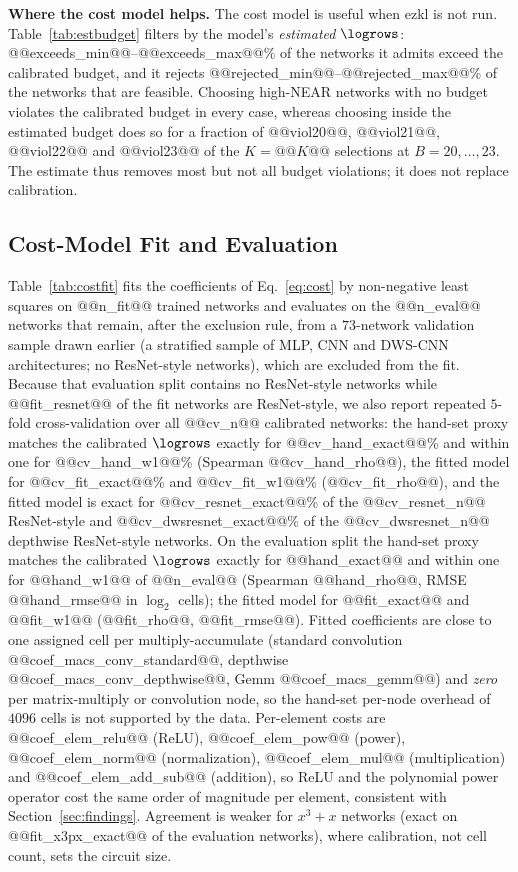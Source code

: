 \textbf{Where the cost model helps.}  The cost model is useful when ezkl is not run.  Table~\ref{tab:estbudget} filters by the model's \emph{estimated} $\logrows$:
@@exceeds_min@@--@@exceeds_max@@\% of the networks it admits exceed the calibrated budget, and it rejects @@rejected_min@@--@@rejected_max@@\% of the networks that are feasible.  Choosing high-NEAR networks with no budget
violates the calibrated budget in every case, whereas choosing inside the estimated budget does so for a fraction of @@viol20@@, @@viol21@@, @@viol22@@ and @@viol23@@ of the $K=@@K@@$ selections at $B=20,\dots,23$.  The estimate thus removes most
but not all budget violations; it does not replace calibration.





\subsection{Cost-Model Fit and Evaluation}

Table~\ref{tab:costfit} fits the coefficients of Eq.~\eqref{eq:cost} by non-negative least squares on @@n_fit@@ trained networks and evaluates on the @@n_eval@@ networks that remain, after the exclusion rule, from a $73$-network validation sample drawn earlier (a stratified sample of MLP, CNN and DWS-CNN architectures; no ResNet-style networks), which are excluded from the fit.
Because that evaluation split contains no ResNet-style networks while @@fit_resnet@@ of the fit networks are ResNet-style, we also report repeated $5$-fold cross-validation over all @@cv_n@@ calibrated networks: the hand-set proxy matches the calibrated $\logrows$ exactly for @@cv_hand_exact@@\% and within one for @@cv_hand_w1@@\% (Spearman @@cv_hand_rho@@), the fitted model for @@cv_fit_exact@@\% and @@cv_fit_w1@@\% (@@cv_fit_rho@@), and the fitted model is exact for @@cv_resnet_exact@@\% of the @@cv_resnet_n@@ ResNet-style and @@cv_dwsresnet_exact@@\% of the @@cv_dwsresnet_n@@ depthwise ResNet-style networks.
On the evaluation split the hand-set proxy matches the calibrated $\logrows$ exactly for @@hand_exact@@ and within one for @@hand_w1@@ of @@n_eval@@ (Spearman @@hand_rho@@, RMSE @@hand_rmse@@ in $\log_2$ cells);
the fitted model for @@fit_exact@@ and @@fit_w1@@ (@@fit_rho@@, @@fit_rmse@@).  Fitted coefficients are close to one assigned cell per multiply-accumulate (standard convolution @@coef_macs_conv_standard@@, depthwise
@@coef_macs_conv_depthwise@@, Gemm @@coef_macs_gemm@@) and \emph{zero} per matrix-multiply or convolution node, so the hand-set per-node overhead of $4096$ cells is not supported by the data.  Per-element costs are
@@coef_elem_relu@@ (ReLU), @@coef_elem_pow@@ (power), @@coef_elem_norm@@ (normalization), @@coef_elem_mul@@ (multiplication) and @@coef_elem_add_sub@@ (addition), so ReLU and the polynomial power operator cost the same order of magnitude per element, consistent
with Section~\ref{sec:findings}.  Agreement is weaker for $x^3{+}x$ networks (exact on @@fit_x3px_exact@@ of the evaluation networks), where calibration, not cell count, sets the circuit size.


